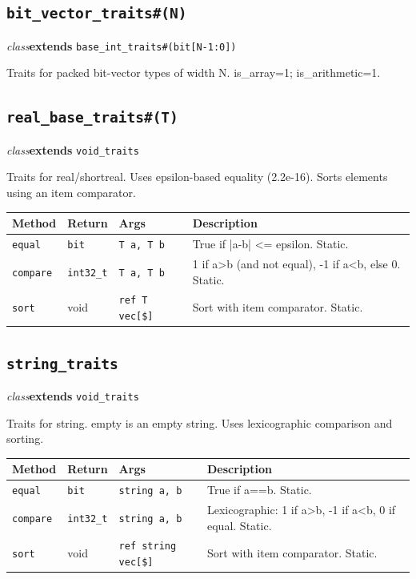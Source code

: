 \documentclass[11pt,letterpaper]{report}
\begin{document}
\subsection*{\texttt{bit\_vector\_traits\#(N)}}
\noindent\small\textit{class}\quad \textbf{extends} \texttt{base\_int\_traits\#(bit[N-1:0])}\par

Traits for packed bit-vector types of width N. is\_array=1; is\_arithmetic=1.


\subsection*{\texttt{real\_base\_traits\#(T)}}
\noindent\small\textit{class}\quad \textbf{extends} \texttt{void\_traits}\par

Traits for real/shortreal. Uses epsilon-based equality (2.2e-16). Sorts elements using an item comparator.

\begin{xltabular}{\linewidth}{>{\small}p{1.35in} >{\small}p{1.25in} >{\small}p{0.95in} >{\small}X}
\toprule
\textbf{Method} & \textbf{Return} & \textbf{Args} & \textbf{Description} \\
\midrule
\endhead
\bottomrule
\endfoot
\texttt{equal} & \texttt{bit} & \texttt{T a, T b} & True if |a-b| \textless{}= epsilon. Static. \\
\texttt{compare} & \texttt{int32\_t} & \texttt{T a, T b} & 1 if a\textgreater{}b (and not equal), -1 if a\textless{}b, else 0. Static. \\
\texttt{sort} & void & \texttt{ref T vec[\$]} & Sort with item comparator. Static. \\
\end{xltabular}

\subsection*{\texttt{string\_traits}}
\noindent\small\textit{class}\quad \textbf{extends} \texttt{void\_traits}\par

Traits for string. empty is an empty string. Uses lexicographic comparison and sorting.

\begin{xltabular}{\linewidth}{>{\small}p{1.35in} >{\small}p{1.25in} >{\small}p{0.95in} >{\small}X}
\toprule
\textbf{Method} & \textbf{Return} & \textbf{Args} & \textbf{Description} \\
\midrule
\endhead
\bottomrule
\endfoot
\texttt{equal} & \texttt{bit} & \texttt{string a, b} & True if a==b. Static. \\
\texttt{compare} & \texttt{int32\_t} & \texttt{string a, b} & Lexicographic: 1 if a\textgreater{}b, -1 if a\textless{}b, 0 if equal. Static. \\
\texttt{sort} & void & \texttt{ref string vec[\$]} & Sort with item comparator. Static. \\
\end{xltabular}
\end{document}

